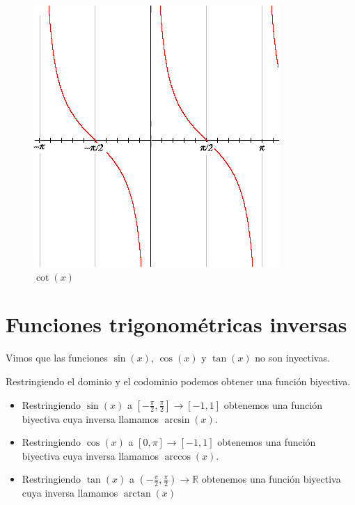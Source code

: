 \begin{figure}[h]
\centering\includegraphics[scale=0.5]{images/01_precalculo/cot.png}
\caption{$\cot(x)$}
\end{figure}


\section{Funciones trigonométricas inversas}

Vimos que las funciones $\sin(x)$, $\cos(x)$ y $\tan(x)$ no son inyectivas.  

Restringiendo el dominio y el codominio podemos obtener una función biyectiva.

\begin{definition}
\begin{itemize}
Definimos las funciones trigonométricas inversas como sigue

\item Restringiendo $\sin(x)$ a $[-\frac{\pi}{2}, \frac{\pi}{2}] \to [-1,1]$ obtenemos una función biyectiva cuya inversa llamamos $ \arcsin(x) $. 

\item Restringiendo $\cos(x)$ a $[0, \pi] \to [-1,1]$ obtenemos una función biyectiva cuya inversa llamamos $ \arccos(x) $. 

\item Restringiendo $\tan(x)$ a $(-\frac{\pi}{2}, \frac{\pi}{2}) \to \mathbb{R}$ obtenemos una función biyectiva cuya inversa llamamos $\arctan(x)$ 

\end{itemize}
\end{definition}

